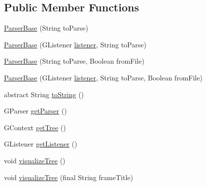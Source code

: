 \subsection*{Public Member Functions}
\begin{DoxyCompactItemize}
\item 
\hyperlink{classit_1_1emarolab_1_1cagg_1_1core_1_1language_1_1parser_1_1ANTLRInterface_1_1ParserBase_3_01GL50c14717389f32c0d6ed45a3d8ee0386_a91f9d2dfcfff5c855c23100d93dd599d}{Parser\-Base} (String to\-Parse)
\item 
\hyperlink{classit_1_1emarolab_1_1cagg_1_1core_1_1language_1_1parser_1_1ANTLRInterface_1_1ParserBase_3_01GL50c14717389f32c0d6ed45a3d8ee0386_a237371c0628c5a2530ae183abee19213}{Parser\-Base} (G\-Listener \hyperlink{classit_1_1emarolab_1_1cagg_1_1core_1_1language_1_1parser_1_1ANTLRInterface_1_1ParserBase_3_01GL50c14717389f32c0d6ed45a3d8ee0386_aa1857a69d5cdd768a2507d9c87fb3d7b}{listener}, String to\-Parse)
\item 
\hyperlink{classit_1_1emarolab_1_1cagg_1_1core_1_1language_1_1parser_1_1ANTLRInterface_1_1ParserBase_3_01GL50c14717389f32c0d6ed45a3d8ee0386_a935ed4a988f26f7c4bdcf7cd2a3f9e29}{Parser\-Base} (String to\-Parse, Boolean from\-File)
\item 
\hyperlink{classit_1_1emarolab_1_1cagg_1_1core_1_1language_1_1parser_1_1ANTLRInterface_1_1ParserBase_3_01GL50c14717389f32c0d6ed45a3d8ee0386_a5d9e6adb004c992374f6e3671e7418b1}{Parser\-Base} (G\-Listener \hyperlink{classit_1_1emarolab_1_1cagg_1_1core_1_1language_1_1parser_1_1ANTLRInterface_1_1ParserBase_3_01GL50c14717389f32c0d6ed45a3d8ee0386_aa1857a69d5cdd768a2507d9c87fb3d7b}{listener}, String to\-Parse, Boolean from\-File)
\item 
abstract String \hyperlink{classit_1_1emarolab_1_1cagg_1_1core_1_1language_1_1parser_1_1ANTLRInterface_1_1ParserBase_3_01GL50c14717389f32c0d6ed45a3d8ee0386_a65b11e19f4c0df4e95e7d08b1d117885}{to\-String} ()
\item 
G\-Parser \hyperlink{classit_1_1emarolab_1_1cagg_1_1core_1_1language_1_1parser_1_1ANTLRInterface_1_1ParserBase_3_01GL50c14717389f32c0d6ed45a3d8ee0386_a9fcf2b97d7e6f477cb2c285e638239a1}{get\-Parser} ()
\item 
G\-Context \hyperlink{classit_1_1emarolab_1_1cagg_1_1core_1_1language_1_1parser_1_1ANTLRInterface_1_1ParserBase_3_01GL50c14717389f32c0d6ed45a3d8ee0386_a7897e5873a966eacb07362a3c8db3e46}{get\-Tree} ()
\item 
G\-Listener \hyperlink{classit_1_1emarolab_1_1cagg_1_1core_1_1language_1_1parser_1_1ANTLRInterface_1_1ParserBase_3_01GL50c14717389f32c0d6ed45a3d8ee0386_a234b535f9abd13372860485874363dd0}{get\-Listener} ()
\item 
void \hyperlink{classit_1_1emarolab_1_1cagg_1_1core_1_1language_1_1parser_1_1ANTLRInterface_1_1ParserBase_3_01GL50c14717389f32c0d6ed45a3d8ee0386_aa21c719a3c3ab1a55fbe452a2e4fd540}{visualize\-Tree} ()
\item 
void \hyperlink{classit_1_1emarolab_1_1cagg_1_1core_1_1language_1_1parser_1_1ANTLRInterface_1_1ParserBase_3_01GL50c14717389f32c0d6ed45a3d8ee0386_a870106b60d2cf96018bd9d65f11cb797}{visualize\-Tree} (final String frame\-Title)
\end{DoxyCompactItemize}
